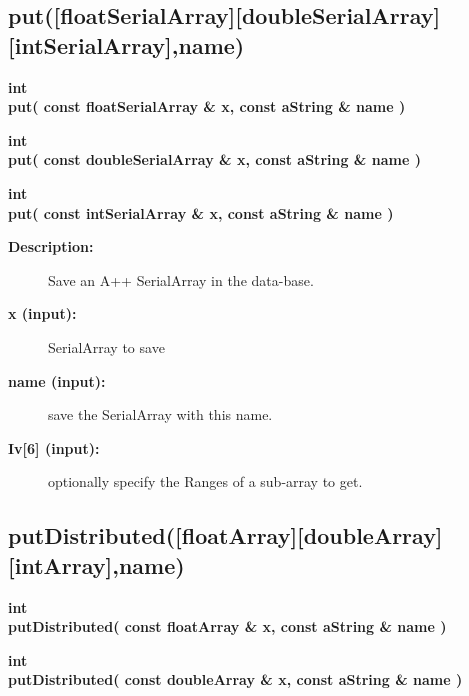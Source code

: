 \subsection{put([floatSerialArray][doubleSerialArray][intSerialArray],name) }
 
\begin{flushleft} \textbf{%
int  \\ 
\settowidth{\GenericDataBaseIncludeArgIndent}{put(}%
put( const floatSerialArray \& x, const aString \& name ) 
}\end{flushleft}
    

 
\begin{flushleft} \textbf{%
int  \\ 
\settowidth{\GenericDataBaseIncludeArgIndent}{put(}%
put( const doubleSerialArray \& x, const aString \& name ) 
}\end{flushleft}
    

 
\begin{flushleft} \textbf{%
int  \\ 
\settowidth{\GenericDataBaseIncludeArgIndent}{put(}%
put( const intSerialArray \& x, const aString \& name )
}\end{flushleft}
    
\begin{description}
\item[{\bf Description:}]  Save an A++ SerialArray in the data-base.
\item[{\bf x (input):}]  SerialArray to save
\item[{\bf name (input):}]  save the SerialArray with this name.
\item[{\bf Iv[6] (input):}]  optionally specify the Ranges of a sub-array to get.
 
\end{description}
\subsection{putDistributed([floatArray][doubleArray][intArray],name) }
 
\begin{flushleft} \textbf{%
int  \\ 
\settowidth{\GenericDataBaseIncludeArgIndent}{putDistributed(}%
putDistributed( const floatArray \& x, const aString \& name ) 
}\end{flushleft}
    

 
\begin{flushleft} \textbf{%
int  \\ 
\settowidth{\GenericDataBaseIncludeArgIndent}{putDistributed(}%
putDistributed( const doubleArray \& x, const aString \& name ) 
}\end{flushleft}
    

